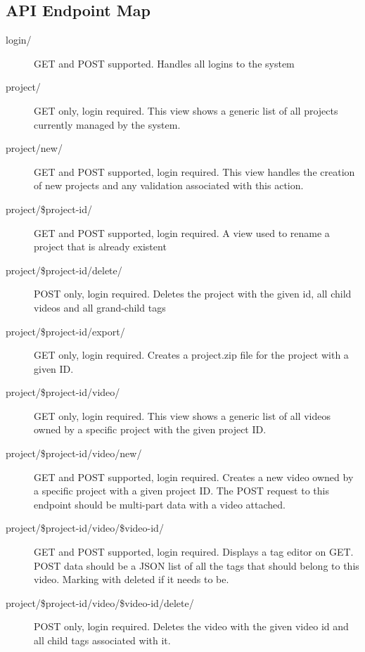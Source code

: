 \documentclass[12pt]{report}
\begin{document}
\begin{appendices}
    \subsection{API Endpoint Map}
    \begin{description}
        \item[login/] GET and POST supported. Handles all logins to the system
        \item[project/] GET only, login required. This view shows a generic list of all projects currently managed by the system. 
        \item[project/new/] GET and POST supported, login required. This view handles the creation of new projects and any validation associated with this action.
        \item[project/\$project-id/] GET and POST supported, login required. A view used to rename a project that is already existent
        \item[project/\$project-id/delete/] POST only, login required. Deletes the project with the given id, all child videos and all grand-child tags
        \item[project/\$project-id/export/] GET only, login required. Creates a project.zip file for the project with a given ID.
        \item[project/\$project-id/video/] GET only, login required. This view shows a generic list of all videos owned by a specific project with the given project ID.
        \item[project/\$project-id/video/new/] GET and POST supported, login required. Creates a new video owned by a specific project with a given project ID. The POST request to this endpoint should be multi-part data with a video attached.
        \item[project/\$project-id/video/\$video-id/] GET and POST supported, login required. Displays a tag editor on GET. POST data should be a JSON list of all the tags that should belong to this video. Marking with deleted if it needs to be.
        \item[project/\$project-id/video/\$video-id/delete/] POST only, login required. Deletes the video with the given video id and all child tags associated with it.
    \end{description}


\end{appendices}
\end{document}
